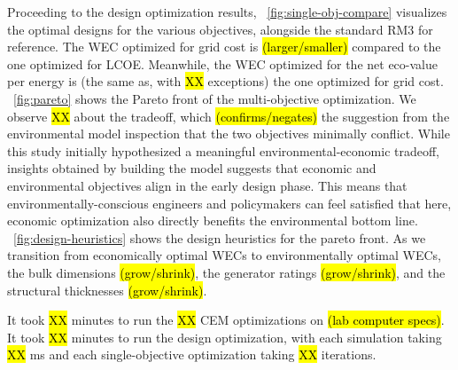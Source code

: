 \documentclass[10pt,twoside]{article}
\begin{document}
Proceeding to the design optimization results, \figureautorefname~\ref{fig:single-obj-compare} visualizes the optimal designs for the various objectives, alongside the standard RM3 for reference.
The WEC optimized for grid cost is \hl{(larger/smaller)} compared to the one optimized for LCOE.
Meanwhile, the WEC optimized for the net eco-value per energy is (the same as, with \hl{XX} exceptions) the one optimized for grid cost.
\figureautorefname~\ref{fig:pareto} shows the Pareto front of the multi-objective optimization.
We observe \hl{XX} about the tradeoff, which \hl{(confirms/negates)} the suggestion from the environmental model inspection that the two objectives minimally conflict.
While this study initially hypothesized a meaningful environmental-economic tradeoff, insights obtained by building the model suggests that economic and environmental objectives align in the early design phase.
This means that environmentally-conscious engineers and policymakers can feel satisfied that here, economic optimization also directly benefits the environmental bottom line.
\figureautorefname~\ref{fig:design-heuristics} shows the design heuristics for the pareto front.
As we transition from economically optimal WECs to environmentally optimal WECs, the bulk dimensions \hl{(grow/shrink)}, the generator ratings \hl{(grow/shrink)}, and the structural thicknesses \hl{(grow/shrink)}.

It took \hl{XX} minutes to run the \hl{XX} CEM optimizations on \hl{(lab computer specs)}.
It took \hl{XX} minutes to run the design optimization, with each simulation taking \hl{XX} ms and each single-objective optimization taking \hl{XX} iterations.
\end{document}
